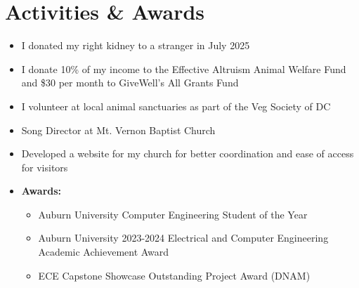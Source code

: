 \documentclass[10pt, letterpaper]{article}
\newenvironment{highlights}{
    \begin{itemize}[topsep=0.10 cm,parsep=0.10 cm,partopsep=0pt,itemsep=0pt,leftmargin=0.4 cm + 10pt]
}{
    \end{itemize}
}
\newenvironment{onecolentry}{
    \begin{adjustwidth}{0.2 cm}{0.2 cm}
}{
    \end{adjustwidth}
}
\begin{document}
    \section{Activities \& Awards}
        \begin{onecolentry}
            \begin{highlights}
                \item I donated my right kidney to a stranger in July 2025
                \item I donate 10\% of my income to the Effective Altruism Animal Welfare Fund and \$30 per month to GiveWell's All Grants Fund
                \item I volunteer at local animal sanctuaries as part of the Veg Society of DC
                \item Song Director at Mt. Vernon Baptist Church
                \item Developed a website for my church for better coordination and ease of access for visitors
                \item \textbf{Awards:} 
                \begin{highlights}
                    \item Auburn University Computer Engineering Student of the Year
                    \item Auburn University 2023-2024 Electrical and Computer Engineering Academic Achievement Award
                    \item ECE Capstone Showcase Outstanding Project Award (DNAM)
                \end{highlights}
            \end{highlights}
        \end{onecolentry}
\end{document}
